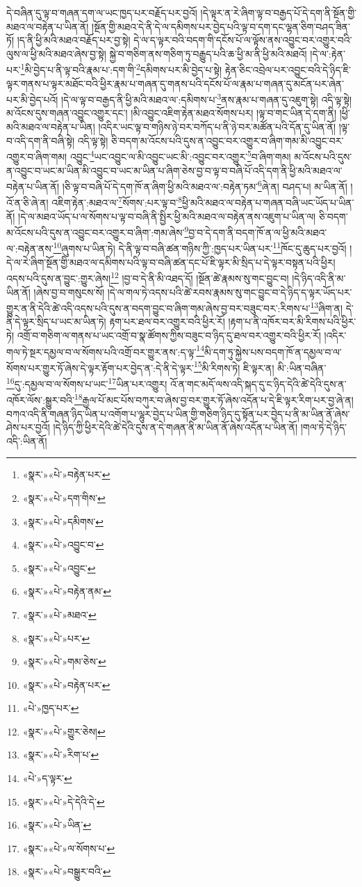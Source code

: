 དེ་བཞིན་དུ་ལྟ་བ་གཞན་དག་ལ་ཡང་ཁྱད་པར་བརྗོད་པར་བྱའོ། །དེ་ལྟར་ན་རེ་ཞིག་ལྟ་བ་བརྒྱད་པོ་དེ་དག་ནི་སྔོན་གྱི་མཐའ་ལ་བརྟེན་པ་ཡིན་ནོ། །སྔོན་གྱི་མཐའ་དེ་ནི་དེ་ལ་དམིགས་པར་བྱེད་པའི་ལྟ་བ་དག་དང་ལྷན་ཅིག་བཤད་ཟིན་ཏོ། །ད་ནི་ཕྱི་མའི་མཐའ་བརྗོད་པར་བྱ་སྟེ། དེ་ལ་ད་ལྟར་བའི་བདག་གི་དངོས་པོ་ལ་ལྟོས་ནས་འབྱུང་བར་འགྱུར་བའི་ལུས་ལ་ཕྱི་མའི་མཐའ་ཞེས་བྱ་སྟེ། སྐྱེ་བ་གཅིག་ནས་གཅིག་ཏུ་བརྒྱུད་པའི་ཆ་ཕྱི་མ་ནི་ཕྱི་མའི་མཐའོ། །དེ་ལ་:རྟེན་པར་\footnote{«སྣར་»«པེ་»བརྟེན་པར་}མི་བྱེད་པ་ནི་ལྟ་བའི་རྣམ་པ་:དག་གི་\footnote{«སྣར་»«པེ་»དག་གིས་}དམིགས་པར་མི་བྱེད་པ་སྟེ། རྟེན་ཅིང་འབྲེལ་པར་འབྱུང་བའི་དེ་ཉིད་ཇི་ལྟར་གནས་པ་ལྟར་མཐོང་བའི་ཕྱིར་རྣམ་པ་གཞན་དུ་གནས་པའི་དངོས་པོ་ལ་རྣམ་པ་གཞན་དུ་མངོན་པར་ཞེན་པར་མི་བྱེད་པའོ། །དེ་ལ་ལྟ་བ་བརྒྱད་ནི་ཕྱི་མའི་མཐའ་ལ་:དམིགས་པ་\footnote{«སྣར་»«པེ་»དམིགས་}ནས་རྣམ་པ་གཞན་དུ་འཇུག་སྟེ། འདི་ལྟ་སྟེ། མ་འོངས་དུས་གཞན་འབྱུང་འགྱུར་དང་། །མི་འབྱུང་འཇིག་རྟེན་མཐའ་སོགས་པར། །ལྟ་བ་གང་ཡིན་དེ་དག་ནི། །ཕྱི་མའི་མཐའ་ལ་བརྟེན་པ་ཡིན། །འདིར་ཡང་ལྟ་བ་གཉིས་ཉེ་བར་བཀོད་པ་ནི་ཉེ་བར་མཚོན་པའི་དོན་དུ་ཡིན་ནོ། །ལྟ་བ་འདི་དག་ནི་བཞི་སྟེ། འདི་ལྟ་སྟེ། ཅི་བདག་མ་འོངས་པའི་དུས་ན་འབྱུང་བར་འགྱུར་བ་ཞིག་གམ་མི་འབྱུང་བར་འགྱུར་བ་ཞིག་གམ། འབྱུང་\footnote{«སྣར་»«པེ་»འབྱུང་བ་}ཡང་འབྱུང་ལ་མི་འབྱུང་ཡང་མི་:འབྱུང་བར་འགྱུར་\footnote{«སྣར་»«པེ་»འབྱུང་}བ་ཞིག་གམ། མ་འོངས་པའི་དུས་ན་འབྱུང་བ་ཡང་མ་ཡིན་མི་འབྱུང་བ་ཡང་མ་ཡིན་པ་ཞིག་ཅེས་བྱ་བ་ལྟ་བ་བཞི་པོ་འདི་དག་ནི་ཕྱི་མའི་མཐའ་ལ་བརྟེན་པ་ཡིན་ནོ། །ཅི་ལྟ་བ་བཞི་པོ་དེ་དག་ཁོ་ན་ཞིག་ཕྱི་མའི་མཐའ་ལ་:བརྟེན་ཏམ་\footnote{«སྣར་»«པེ་»བརྟེན་ནམ་}ཞེ་ན། བཤད་པ། མ་ཡིན་ནོ། །འོ་ན་ཅི་ཞེ་ན། འཇིག་རྟེན་:མཐའ་ལ་\footnote{«སྣར་»«པེ་»མཐའ་}སོགས་:པར་ལྟ་བ་\footnote{«སྣར་»«པེ་»པར་}ཕྱི་མའི་མཐའ་ལ་བརྟེན་པ་གཞན་བཞི་ཡང་ཡོད་པ་ཡིན་ནོ། །དེ་ལ་མཐའ་ཡོད་པ་ལ་སོགས་པ་ལྟ་བ་བཞི་ནི་སྤྱིར་ཕྱི་མའི་མཐའ་ལ་བརྟེན་ནས་འཇུག་པ་ཡིན་ལ། ཅི་བདག་མ་འོངས་པའི་དུས་ན་འབྱུང་བར་འགྱུར་བ་ཞིག་:གམ་ཞེས་\footnote{«སྣར་»«པེ་»གམ་ཅེས་}བྱ་བ་དེ་དག་ནི་བདག་ཁོ་ན་ལ་ཕྱི་མའི་མཐའ་ལ་:བརྟེན་ནས་\footnote{«སྣར་»«པེ་»བརྟེན་པར་}ཞུགས་པ་ཡིན་ཏེ། དེ་ནི་ལྟ་བ་བཞི་ཚན་གཉིས་ཀྱི་:ཁྱད་པར་ཡིན་པར་\footnote{«པེ་»ཁྱད་པར་}ཁོང་དུ་ཆུད་པར་བྱའོ། །དེ་ལ་རེ་ཞིག་སྔོན་གྱི་མཐའ་ལ་དམིགས་པའི་ལྟ་བ་བཞི་ཚན་དང་པོ་ཇི་ལྟར་མི་སྲིད་པ་དེ་ལྟར་བསྟན་པའི་ཕྱིར། འདས་པའི་དུས་ན་བྱུང་:གྱུར་ཞེས།\footnote{«སྣར་»«པེ་»གྱུར་ཅེས།} །བྱ་བ་དེ་ནི་མི་འཐད་དོ། །སྔོན་ཚེ་རྣམས་སུ་གང་བྱུང་བ། །དེ་ཉིད་འདི་ནི་མ་ཡིན་ནོ། །ཞེས་བྱ་བ་གསུངས་སོ། །དེ་ལ་གལ་ཏེ་འདས་པའི་ཚེ་རབས་རྣམས་སུ་གང་བྱུང་བ་དེ་ཉིད་ད་ལྟར་ཡོད་པར་གྱུར་ན་ནི་དེའི་ཚེ་འདི་འདས་པའི་དུས་ན་བདག་བྱུང་བ་ཞིག་གམ་ཞེས་བྱ་བར་བཟུང་བར་:རིགས་པ་\footnote{«སྣར་»«པེ་»རིག་པ་}ཞིག་ན། དེ་ནི་དེ་ལྟར་སྲིད་པ་ཡང་མ་ཡིན་ཏེ། རྟག་པར་ཐལ་བར་འགྱུར་བའི་ཕྱིར་རོ། །རྟག་པ་ནི་འཁོར་བར་མི་རིགས་པའི་ཕྱིར་ཏེ། འགྲོ་བ་གཅིག་ལ་གནས་པ་ཡང་འགྲོ་བ་སྣ་ཚོགས་ཀྱིས་བཟུང་བ་ཉིད་དུ་ཐལ་བར་འགྱུར་བའི་ཕྱིར་རོ། །འདིར་གལ་ཏེ་སྔར་དམྱལ་བ་ལ་སོགས་པའི་འགྲོ་བར་གྱུར་ནས་:ད་ལྟ་\footnote{«པེ་»ད་ལྟར་}མི་དག་ཏུ་སྐྱེས་པས་བདག་ཁོ་ན་དམྱལ་བ་ལ་སོགས་པར་གྱུར་ཏོ་ཞེས་དེ་ལྟར་རྟོག་པར་བྱེད་ན་:དེ་ནི་དེ་ལྟར་\footnote{«སྣར་»«པེ་»དེ་དེའི་དེ་}མི་རིགས་ཏེ། ཇི་ལྟར་ན། མི་:ཡིན་བཞིན་\footnote{«སྣར་»«པེ་»ཡིན་}དུ་:དམྱལ་བ་ལ་སོགས་པ་ཡང་\footnote{«སྣར་»«པེ་»ལ་སོགས་པ་}ཡིན་པར་འགྱུར། འོ་ན་གང་མདོ་ལས་འདི་སྐད་དུ་ང་ཉིད་དེའི་ཚེ་དེའི་དུས་ན་འཁོར་ལོས་:སྒྱུར་བའི་\footnote{«སྣར་»«པེ་»བསྒྱུར་བའི་}རྒྱལ་པོ་མང་པོས་བཀུར་བ་ཞེས་བྱ་བར་གྱུར་ཏོ་ཞེས་འདོན་པ་དེ་ཇི་ལྟར་རིག་པར་བྱ་ཞེ་ན། བཀའ་འདི་ནི་གཞན་ཉིད་ཡིན་པ་འགོག་པ་ལྷུར་བྱེད་པ་ཡིན་གྱི་གཅིག་ཉིད་དུ་སྟོན་པར་བྱེད་པ་ནི་མ་ཡིན་ནོ་ཞེས་ཤེས་པར་བྱའོ། །དེ་ཉིད་ཀྱི་ཕྱིར་དེའི་ཚེ་དེའི་དུས་ན་དེ་གཞན་ནི་མ་ཡིན་ནོ་ཞེས་འདོན་པ་ཡིན་ནོ། །གལ་ཏེ་དེ་ཉིད་འདི་:ཡིན་ནོ། 